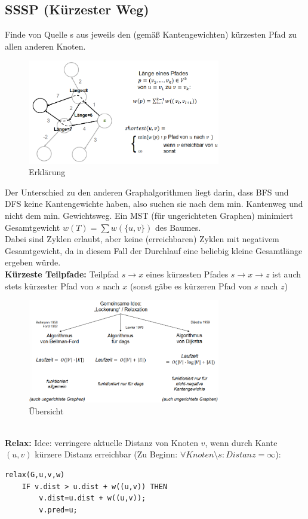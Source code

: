 \documentclass{article}
\begin{document}
        \subsection{SSSP (Kürzester Weg)}
            Finde von Quelle s aus jeweils den (gemäß Kantengewichten) kürzesten Pfad zu allen anderen Knoten.\\
            \begin{figure}[ht]
                \centering
                \includegraphics[width=0.75\textwidth]{Bilder/SSSP.png}
                \caption{Erklärung}
                \label{fig:SSSP}
            \end{figure}
            \newpage
            Der Unterschied zu den anderen Graphalgorithmen liegt darin, dass BFS und DFS keine Kantengewichte haben, also suchen sie nach dem min. Kantenweg und nicht dem min. Gewichtsweg. Ein MST (für ungerichteten Graphen) minimiert Gesamtgewicht $w(T)=\sum w(\{u,v\})$ des Baumes.\\
            Dabei sind Zyklen erlaubt, aber keine (erreichbaren) Zyklen mit negativem Gesamtgewicht, da in diesem Fall der Durchlauf eine beliebig kleine Gesamtlänge ergeben würde.\\
            \textbf{Kürzeste Teilpfade:} Teilpfad $s \rightarrow x$ eines kürzesten Pfades $s\rightarrow x\rightarrow z$ ist auch stets kürzester Pfad von $s$ nach $x$ (sonst gäbe es kürzeren Pfad von $s$ nach $z$)\\
            \begin{figure}[ht]
                \centering
                \includegraphics[width=0.75\textwidth]{Bilder/SSSPAlgs.png}
                \caption{Übersicht}
                \label{fig:SSSPAlgs}
            \end{figure}\\
            \textbf{Relax:} Idee: verringere aktuelle Distanz von Knoten $v$, wenn durch Kante $(u,v)$ kürzere Distanz erreichbar (Zu Beginn: $\forall Knoten \setminus s: Distanz= \infty$):
            \begin{lstlisting}[style=pseudocode]
relax(G,u,v,w)
    IF v.dist > u.dist + w((u,v)) THEN
        v.dist=u.dist + w((u,v));
        v.pred=u;
            \end{lstlisting}
\end{document}
